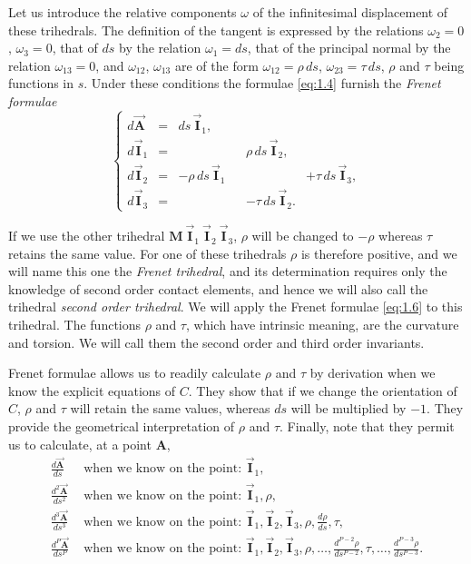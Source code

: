 \documentclass[leqno,11pt]{book}
\numberwithin{equation}{chapter}
\theoremstyle{shape1}
\theoremstyle{shapesmall}
\newcommand{\rvec}[1]{\vec{\mathbf{#1}}}
\newcommand{\ivec}{\rvec{I}}
\begin{document}
Let us introduce the relative components $\omega$ of the infinitesimal displacement of these trihedrals. The definition of the tangent is expressed by the relations $\omega_{2}=0$, $\omega_{3}=0$, that of $ds$ by the relation $\omega_{1}=ds$, that of the principal normal by the relation $\omega_{13}=0$, and $\omega_{12}$, $\omega_{13}$ are of the form $\omega_{12}=\rho\,ds$, $\omega_{23}=\tau\,ds$, $\rho$ and $\tau$ being functions in $s$. Under these conditions the formulae \eqref{eq:1.4} furnish the \emph{Frenet formulae}
\begin{equation}
  \label{eq:1.6}
  \left\{
    \begin{alignedat}{3}
      d{\rvec{A}}&=&ds\,\ivec_{1},\\
      d\ivec_{1}&=&&&\rho\,ds\,\ivec_{2},\\
      d\ivec_{2}&={}&-\rho\,ds\,\ivec_{1}&&&+\tau\,ds\,\ivec_{3},\\
      d\ivec_{3}&=&&&-\tau\,ds\,\ivec_{2}.
    \end{alignedat}
  \right.
\end{equation}

If we use the other trihedral $\mathbf{M}\ \ivec_{1}\ \ivec_{2}\ \ivec_{3}$, $\rho$ will be changed to $-\rho$ whereas $\tau$ retains the same value. For one of these trihedrals $\rho$ is therefore positive, and we will name this one the \emph{Frenet trihedral}, and its determination requires only the knowledge of second order contact elements, and hence we will also call the trihedral \emph{second order trihedral}. We will apply the Frenet formulae \eqref{eq:1.6} to this trihedral. The functions $\rho$ and $\tau$, which have intrinsic meaning, are the curvature and torsion. We will call them the second order and third order invariants.

Frenet formulae allows us to readily calculate $\rho$ and $\tau$ by derivation when we know the explicit equations of $C$. They show that if we change the orientation of $C$, $\rho$ and $\tau$ will retain the same values, whereas $ds$ will be multiplied by $-1$. They provide the geometrical interpretation of $\rho$ and $\tau$. Finally, note that they permit us to calculate, at a point $\mathbf{A}$,
\begin{align*}
  \frac{d{\rvec{A}}}{ds}&\text{ when we know on the point: } \ivec_{1},\\
  \frac{d^{2}{\rvec{A}}}{ds^{2}}&\text{ when we know on the point: } \ivec_{1}, \rho,\\
  \frac{d^{3}{\rvec{A}}}{ds^{3}}&\text{ when we know on the point: } \ivec_{1},\ivec_{2},\ivec_{3},\rho,\frac{d\rho}{ds},\tau,\\
  \frac{d^{P}{\rvec{A}}}{ds^{P}}&\text{ when we know on the point: } \ivec_{1},\ivec_{2},\ivec_{3},\rho,\dots,\frac{d^{P-2}\rho}{ds^{P-2}},\tau,\dots,\frac{d^{P-3}\rho}{ds^{P-3}}.
\end{align*}
\end{document}
